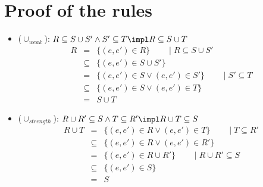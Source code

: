 \section{Proof of the rules}
\begin{itemize}
\item ($\cup_{weak}$): $R \subseteq S \cup S' \land S' \subseteq T \impl R \subseteq S \cup T$
\begin{eqnarray*}
R &=& \{(e,e') \in R\} \qquad \mid R \subseteq S \cup S' \\
&\subseteq & \{(e,e') \in S \cup S'\} \\
&= & \{(e,e') \in S \lor (e,e') \in S'\} \qquad \mid S' \subseteq T \\
&\subseteq & \{(e,e') \in S \lor (e,e') \in T\} \\
&=& S \cup T  
\end{eqnarray*}
\item ($\cup_{strength}$): $R \cup R' \subseteq S \land T \subseteq R' \impl R \cup T \subseteq S$
\begin{eqnarray*}
R \cup T &=& \{(e,e') \in R \lor (e,e') \in T\} \qquad \mid T \subseteq R' \\
&\subseteq & \{(e,e') \in R \lor (e,e') \in R'\} \\
&=& \{(e,e') \in R \cup R'\} \qquad \mid R \cup R' \subseteq S \\
&\subseteq & \{(e,e') \in S\} \\
&=& S
\end{eqnarray*}

\end{itemize}
